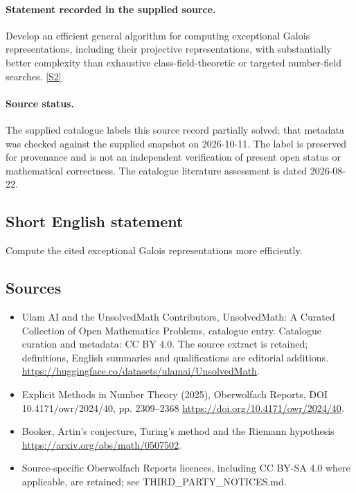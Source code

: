 \documentclass[11pt]{article}
\begin{document}
\paragraph{Statement recorded in the supplied source.}
Develop an efficient general algorithm for computing exceptional Galois representations, including their projective representations, with substantially better complexity than exhaustive class-field-theoretic or targeted number-field searches. \href{https://doi.org/10.4171/owr/2024/40}{[S2]}
\paragraph{Source status.}
The supplied catalogue labels this source record partially solved; that metadata was checked against the supplied snapshot on 2026-10-11. The label is preserved for provenance and is not an independent verification of present open status or mathematical correctness. The catalogue literature assessment is dated 2026-08-22.
\subsection{Short English statement}
Compute the cited exceptional Galois representations more efficiently.
\subsection{Sources}
\begin{itemize}
\item[S1] Ulam AI and the UnsolvedMath Contributors, UnsolvedMath: A Curated Collection of Open Mathematics Problems, catalogue entry. Catalogue curation and metadata: CC BY 4.0. The source extract is retained; definitions, English summaries and qualifications are editorial additions.
\url{https://huggingface.co/datasets/ulamai/UnsolvedMath}.
\item[S2] Explicit Methods in Number Theory (2025), Oberwolfach Reports, DOI 10.4171/owr/2024/40, pp. 2309--2368
\url{https://doi.org/10.4171/owr/2024/40}.
\item[S3] Booker, Artin's conjecture, Turing's method and the Riemann hypothesis
\url{https://arxiv.org/abs/math/0507502}.
\item Source-specific Oberwolfach Reports licences, including CC BY-SA 4.0 where applicable, are retained; see THIRD\_PARTY\_NOTICES.md.
\end{itemize}
\end{document}
